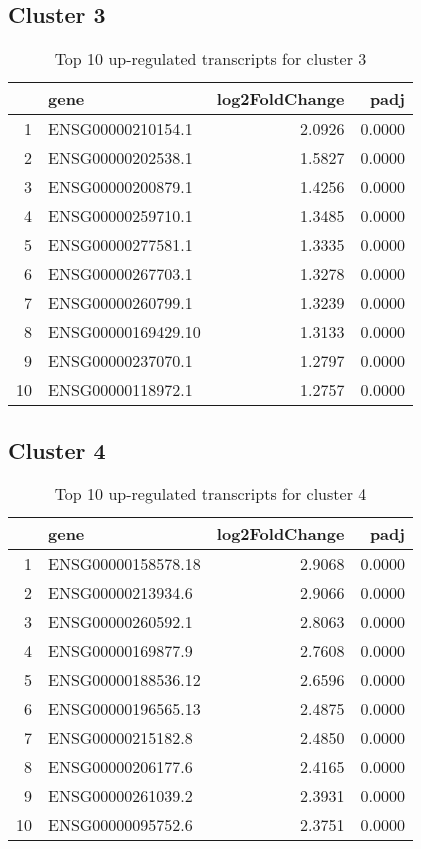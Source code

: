 \documentclass{article}
\begin{document}
\subsection{Cluster 3 }
\begin{table}[H]
\centering
\begin{tabular}{rlrr}
  \hline
 & gene & log2FoldChange & padj \\ 
  \hline
1 & ENSG00000210154.1 & 2.0926 & 0.0000 \\ 
  2 & ENSG00000202538.1 & 1.5827 & 0.0000 \\ 
  3 & ENSG00000200879.1 & 1.4256 & 0.0000 \\ 
  4 & ENSG00000259710.1 & 1.3485 & 0.0000 \\ 
  5 & ENSG00000277581.1 & 1.3335 & 0.0000 \\ 
  6 & ENSG00000267703.1 & 1.3278 & 0.0000 \\ 
  7 & ENSG00000260799.1 & 1.3239 & 0.0000 \\ 
  8 & ENSG00000169429.10 & 1.3133 & 0.0000 \\ 
  9 & ENSG00000237070.1 & 1.2797 & 0.0000 \\ 
  10 & ENSG00000118972.1 & 1.2757 & 0.0000 \\ 
   \hline
\end{tabular}
\caption{Top 10 up-regulated transcripts for cluster 3} 
\label{tab:q3_1_3}
\end{table}
\subsection{Cluster 4 }
\begin{table}[H]
\centering
\begin{tabular}{rlrr}
  \hline
 & gene & log2FoldChange & padj \\ 
  \hline
1 & ENSG00000158578.18 & 2.9068 & 0.0000 \\ 
  2 & ENSG00000213934.6 & 2.9066 & 0.0000 \\ 
  3 & ENSG00000260592.1 & 2.8063 & 0.0000 \\ 
  4 & ENSG00000169877.9 & 2.7608 & 0.0000 \\ 
  5 & ENSG00000188536.12 & 2.6596 & 0.0000 \\ 
  6 & ENSG00000196565.13 & 2.4875 & 0.0000 \\ 
  7 & ENSG00000215182.8 & 2.4850 & 0.0000 \\ 
  8 & ENSG00000206177.6 & 2.4165 & 0.0000 \\ 
  9 & ENSG00000261039.2 & 2.3931 & 0.0000 \\ 
  10 & ENSG00000095752.6 & 2.3751 & 0.0000 \\ 
   \hline
\end{tabular}
\caption{Top 10 up-regulated transcripts for cluster 4} 
\label{tab:q3_1_4}
\end{table}
\end{document}
